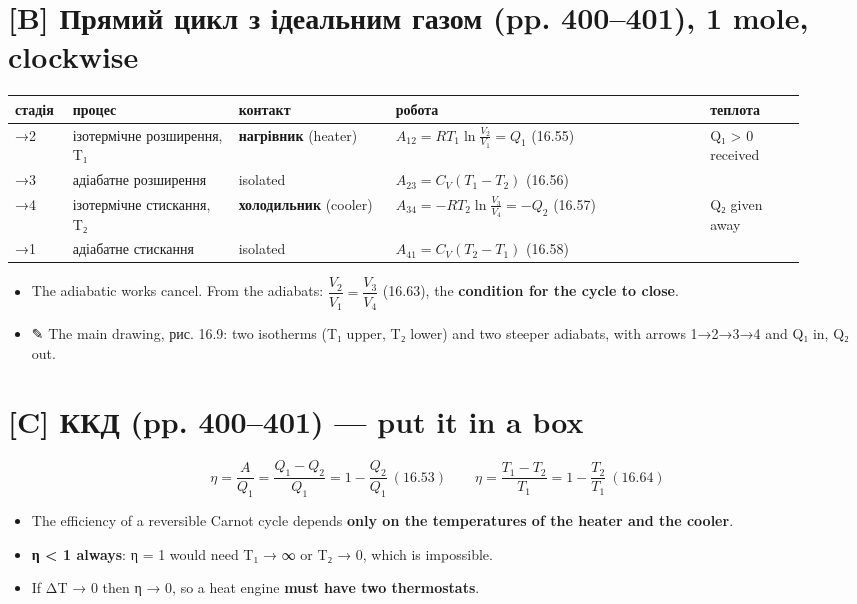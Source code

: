 \documentclass[11pt,a4paper,oneside]{book}
\newcommand{\pen}{{\sffamily\color{accent}✎}}
\begin{document}
\section*{[B] Прямий цикл з ідеальним газом (pp. 400–401), 1 mole, clockwise}
{\footnotesize
\begin{longtable}{>{\raggedright\arraybackslash}p{0.069\linewidth}>{\raggedright\arraybackslash}p{0.193\linewidth}>{\raggedright\arraybackslash}p{0.183\linewidth}>{\raggedright\arraybackslash}p{0.362\linewidth}>{\raggedright\arraybackslash}p{0.113\linewidth}}
\toprule
\textbf{стадія} & \textbf{процес} & \textbf{контакт} & \textbf{робота} & \textbf{теплота} \\
\midrule
\endhead
1→2 & ізотермічне розширення, T₁ & \textbf{нагрівник} (heater) & $A_{12} = RT_1\ln\frac{V_2}{V_1} = Q_1$ (16.55) & Q₁ > 0 received \\
2→3 & адіабатне розширення & isolated & $A_{23} = C_V(T_1 - T_2)$ (16.56) & 0 \\
3→4 & ізотермічне стискання, T₂ & \textbf{холодильник} (cooler) & $A_{34} = -RT_2\ln\frac{V_3}{V_4} = -Q_2$ (16.57) & Q₂ given away \\
4→1 & адіабатне стискання & isolated & $A_{41} = C_V(T_2 - T_1)$ (16.58) & 0 \\
\bottomrule
\end{longtable}
}
\begin{itemize}
\item The adiabatic works cancel. From the adiabats: $\dfrac{V_2}{V_1} = \dfrac{V_3}{V_4}$ (16.63), the \textbf{condition for the cycle to close}.
\item \pen{} The main drawing, рис. 16.9: two isotherms (T₁ upper, T₂ lower) and two steeper adiabats, with arrows 1→2→3→4 and Q₁ in, Q₂ out.
\end{itemize}

\section*{[C] ККД (pp. 400–401) — put it in a box}
\[\eta = \frac A{Q_1} = \frac{Q_1 - Q_2}{Q_1} = 1 - \frac{Q_2}{Q_1}\ (16.53)\qquad \eta = \frac{T_1 - T_2}{T_1} = 1 - \frac{T_2}{T_1}\ (16.64)\]
\begin{itemize}
\item The efficiency of a reversible Carnot cycle depends \textbf{only on the temperatures of the heater and the cooler}.
\item \textbf{η < 1 always}: η = 1 would need T₁ → ∞ or T₂ → 0, which is impossible.
\item If ΔT → 0 then η → 0, so a heat engine \textbf{must have two thermostats}.
\end{itemize}
\end{document}

